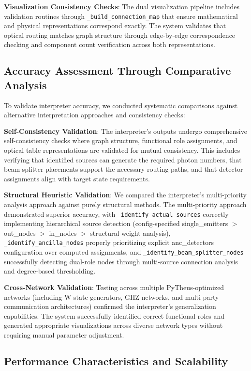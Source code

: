 \documentclass[11pt,a4paper]{article}
\begin{document}
\textbf{Visualization Consistency Checks}: The dual visualization pipeline includes validation routines through \texttt{\_build\_connection\_map} that ensure mathematical and physical representations correspond exactly. The system validates that optical routing matches graph structure through edge-by-edge correspondence checking and component count verification across both representations.

\subsection{Accuracy Assessment Through Comparative Analysis}

To validate interpreter accuracy, we conducted systematic comparisons against alternative interpretation approaches and consistency checks:

\textbf{Self-Consistency Validation}: The interpreter's outputs undergo comprehensive self-consistency checks where graph structure, functional role assignments, and optical table representations are validated for mutual consistency. This includes verifying that identified sources can generate the required photon numbers, that beam splitter placements support the necessary routing paths, and that detector assignments align with target state requirements.

\textbf{Structural Heuristic Validation}: We compared the interpreter's multi-priority analysis approach against purely structural methods. The multi-priority approach demonstrated superior accuracy, with \texttt{\_identify\_actual\_sources} correctly implementing hierarchical source detection (config-specified single\_emitters $>$ out\_nodes $>$ in\_nodes $>$ structural weight analysis), \texttt{\_identify\_ancilla\_nodes} properly prioritizing explicit anc\_detectors configuration over computed assignments, and \texttt{\_identify\_beam\_splitter\_nodes} successfully detecting dual-role nodes through multi-source connection analysis and degree-based thresholding.

\textbf{Cross-Network Validation}: Testing across multiple PyTheus-optimized networks (including W-state generators, GHZ networks, and multi-party communication architectures) confirmed the interpreter's generalization capabilities. The system successfully identified correct functional roles and generated appropriate visualizations across diverse network types without requiring manual parameter adjustment.

\subsection{Performance Characteristics and Scalability}
\end{document}
